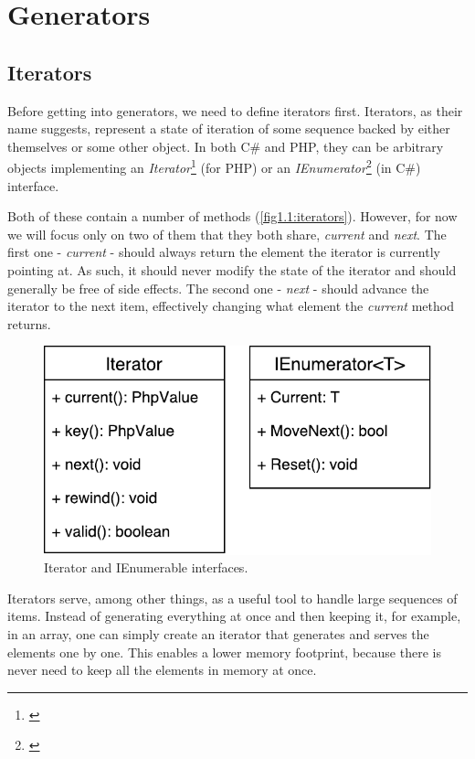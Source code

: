 \chapter{Generators}
\section{Iterators}
Before getting into generators, we need to define iterators first. Iterators, as their name suggests, represent a state of iteration of some sequence backed by either themselves or some other object. In both C\# and PHP, they can be arbitrary objects implementing an \emph{Iterator}\footnote{\citep{IterPHP}} (for PHP) or an \emph{IEnumerator}\footnote{\citep{IterNet}} (in C\#) interface. 

Both of these contain a number of methods  (\autoref{fig1.1:iterators}). However, for now we will focus only on two of them that they both share, \emph{current} and \emph{next}. The first one - \emph{current} - should always return the element the iterator is currently pointing at. As such, it should never modify the state of the iterator and should generally be free of side effects. The second one - \emph{next} - should advance the iterator to the next item, effectively changing what element the \emph{current} method returns.

\begin{figure}[h]	
	\centering	
	\includegraphics[scale=0.75]{../img/1_1_iterators}	
	\caption{Iterator and IEnumerable interfaces.}
	\label{fig1.1:iterators}
\end{figure}

Iterators serve, among other things, as a useful tool to handle large sequences of items. Instead of generating everything at once and then keeping it, for example, in an array, one can simply create an iterator that generates and serves the elements one by one. This enables a lower memory footprint, because there is never need to keep all the elements in memory at once. 

